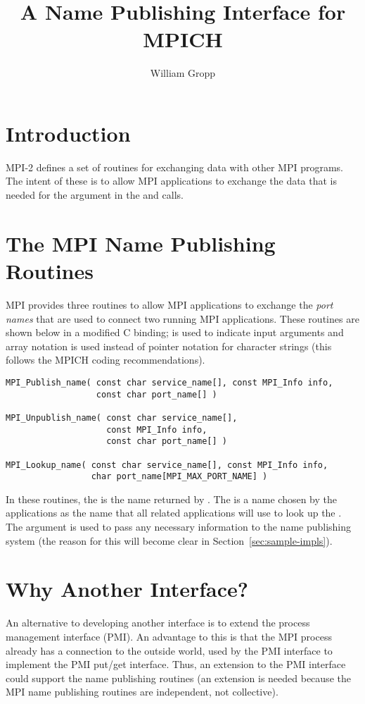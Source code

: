 \documentclass{article}
\begin{document}
\title{A Name Publishing Interface for MPICH}
\author{William Gropp}
\maketitle

\section{Introduction}

MPI-2 defines a set of routines for exchanging data with other MPI
programs.  The intent of these is to allow MPI applications to 
exchange the data that is needed for the  argument in the
 and  calls.  

\section{The MPI Name Publishing Routines}
MPI provides three routines to allow MPI applications to exchange the
\emph{port names} that are used to connect two running MPI
applications.  These routines are shown below in a modified C binding;
 is used to indicate input arguments and array notation is
used instead of pointer notation for character strings (this follows
the MPICH coding recommendations).
\begin{verbatim}
MPI_Publish_name( const char service_name[], const MPI_Info info, 
                  const char port_name[] )

MPI_Unpublish_name( const char service_name[], 
                    const MPI_Info info, 
                    const char port_name[] )

MPI_Lookup_name( const char service_name[], const MPI_Info info, 
                 char port_name[MPI_MAX_PORT_NAME] )
\end{verbatim}
In these routines, the  is the name returned by
.  
The  is a name chosen by the
applications as the name that all related applications will use to
look up the .
The  argument is used to pass any necessary information to
the name publishing system (the reason for this will become clear in
Section~\ref{sec:sample-impls}). 

\section{Why Another Interface?}
An alternative to developing another interface is to extend the
process management interface (PMI).  An advantage to this is that the
MPI process already has a connection to the outside world, used by the
PMI interface to implement the PMI put/get interface.  Thus, an
extension to the PMI interface could support the name publishing
routines (an extension is needed because the MPI name publishing
routines are independent, not collective).
\end{document}
